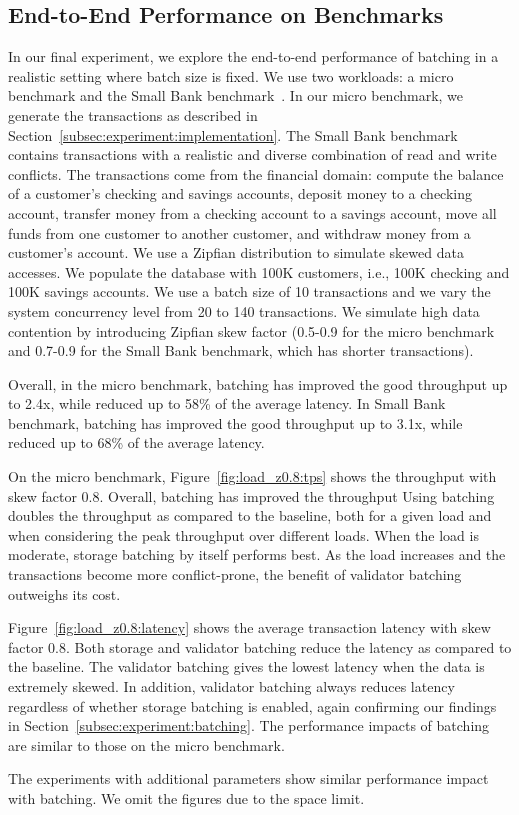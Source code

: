 \subsection{End-to-End Performance on Benchmarks}
\label{subsec:experiment:end2end}
In our final experiment, we explore the end-to-end performance of batching in a realistic setting where batch size is fixed. We use two workloads: a micro benchmark and the Small Bank benchmark~\cite{alomari2008icde}. In our micro benchmark,  we generate the transactions as described in Section~\ref{subsec:experiment:implementation}.  The Small Bank benchmark contains transactions with a realistic and diverse combination of read and write conflicts. The transactions come from the financial domain: compute the balance of a customer's checking and savings accounts, deposit money to a checking account, transfer money from a checking account to a savings account, move all funds from one customer to another customer, and withdraw money from a customer's account. We use a Zipfian distribution to simulate skewed data accesses. We populate the database with 100K customers, i.e., 100K checking and 100K savings accounts. We use a batch size of 10 transactions and we vary the system concurrency level from 20 to 140 transactions. We simulate high data contention by introducing Zipfian skew factor (0.5-0.9 for the micro benchmark and 0.7-0.9 for the Small Bank benchmark, which has shorter transactions).

Overall, in the micro benchmark, batching has improved the good throughput up to 2.4x, while reduced up to 58\% of the average latency. In Small Bank benchmark, batching has improved the good throughput up to 3.1x, while reduced up to 68\% of the average latency.

On the micro benchmark, Figure~\ref{fig:load_z0.8:tps} shows the throughput with skew factor 0.8. Overall, batching has improved the throughput 
Using batching doubles the throughput as compared to the baseline, both for a given load and when considering the peak throughput over different loads. When the load is moderate, storage batching by itself performs best. As the load increases and the transactions become more conflict-prone, the benefit of validator batching outweighs its cost. 

Figure~\ref{fig:load_z0.8:latency} shows the average transaction latency with skew factor 0.8. Both storage and validator batching reduce the latency as compared to the baseline. The validator batching gives the lowest latency when the data is extremely skewed. In addition, validator batching always reduces latency regardless of whether storage batching is enabled, again confirming our findings in Section~\ref{subsec:experiment:batching}. The performance impacts of batching are similar to those on the micro benchmark. 

The experiments with additional parameters show similar performance impact with batching. We omit the figures due to the space limit.